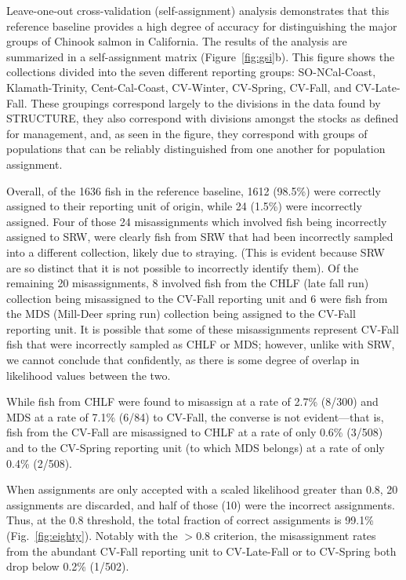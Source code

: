 Leave-one-out cross-validation (self-assignment) analysis demonstrates that this
reference baseline provides a high degree of accuracy for distinguishing the major
groups of Chinook salmon in California.  The results of the analysis are summarized
in a self-assignment matrix (Figure~\ref{fig:gsi}b).
This figure shows the collections divided into the seven different reporting groups:
SO-NCal-Coast,  Klamath-Trinity, Cent-Cal-Coast,
CV-Winter, CV-Spring, CV-Fall, and  CV-Late-Fall.  These groupings correspond
largely to the divisions in the data found by STRUCTURE, they also correspond
with divisions amongst the stocks as defined for management, and, as seen in the
figure, they correspond with groups of populations that can be reliably distinguished
from one another for population assignment.

Overall, of the 1636 fish in the reference baseline, 1612 (98.5\%) were correctly
assigned to their reporting unit of origin, while 24 (1.5\%) were incorrectly assigned.
Four of those 24 misassignments which involved fish being incorrectly assigned to
SRW, were clearly fish from SRW that had been incorrectly sampled into a different
collection, likely due to straying. (This is evident because SRW are so distinct that it is not possible
to incorrectly identify them).  Of the remaining 20 misassignments,  8 involved fish from the
CHLF (late fall run) collection being misassigned to the CV-Fall reporting unit and 6 were
fish from the MDS (Mill-Deer spring run) collection being assigned to the CV-Fall reporting unit.
It is possible that some of these misassignments represent CV-Fall fish that were incorrectly
sampled as CHLF or MDS; however, unlike with SRW,  we  cannot conclude that
confidently, as there is some degree of overlap in likelihood values between the two.

While fish from CHLF were found to misassign at a rate of 2.7\% (8/300) and MDS at a rate
of 7.1\% (6/84) to CV-Fall, the
converse is not evident---that is, fish from the CV-Fall are misassigned to CHLF at a rate
of only 0.6\% (3/508) and to the CV-Spring reporting unit (to which MDS belongs) at a rate
of only 0.4\% (2/508).

When assignments are only accepted with a scaled likelihood greater than 0.8,
20 assignments are discarded, and half of those (10) were the incorrect assignments.  Thus,
at the 0.8 threshold, the total fraction of correct assignments is 99.1\% (Fig.~\ref{fig:eighty}).
Notably with the $>0.8$ criterion, the misassignment rates from the abundant CV-Fall
reporting unit to CV-Late-Fall or to CV-Spring both drop below 0.2\% (1/502).  

